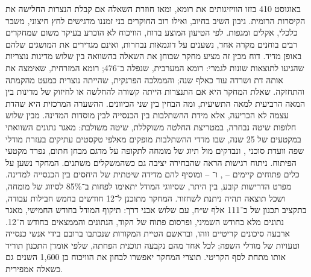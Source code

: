 
\begin{executivesummary}
באוגוסט 410 בזזו הוויזיגותים את רומא, ומאז חוזרת השאלה אם קבלת הנצרות החלישה את הקיסרות הרומית. גיבון השיב בחיוב, ואילו רוב החוקרים בני זמננו מדגישים לחץ חיצוני, משבר כלכלי, אקלים ומגפות. לפי הטיעון המוצע בדוח, הוויכוח לא הוכרע בעיקר משום שמחקרים רבים בוחנים מקרה אחד, נשענים על דוגמאות נבחרות, ואינם מגדירים את המושגים שלהם באופן מדיד. דוח מכין זה מציע מחקר שבוחן את השאלה בהשוואה בין שלוש מדינות נוצריות שהגיעו לתוצאות שונות לגמרי: רומא המערבית, שנפלה ב־476; רומא המזרחית, שאימצה את אותה דת ושרדה עוד כאלף שנה; והממלכה הפרנקית, שהייתה נוצרית כמעט מהקמתה והתחזקה. שאלת המחקר היא אם התנצרות הייתה קשורה להחלשה או לחיזוק של מדינות בין המאה הרביעית למאה התשיעית, ומה הבחין בין שני הכיוונים. ההשערה המרכזית היא שהדת עצמה לא הכריעה, אלא מידת ההשתלבות בין הכנסייה לבין מוסדות המדינה. מבין שלוש חלופות שיטה נבחרה, במטריצת החלטה משוקללת, שיטה משולבת: מאגר נתונים השוואתי במקטעים של 25 שנה, שבו מדדי ההשתלבות מופקים מאלפי טקסטים עתיקים בעזרת מודלי שפה וועדת סוכני , ונבדקים מול תיוג של מומחה לתקופה על מדגם מבחן חתום, נפרד מקטעי הפיתוח. ניתוח רגישות הראה שהבחירה יציבה גם כשהמשקלים משתנים. המחקר נשען על כלים פתוחים קיימים – ,  ו־ – ומוסיף להם מדידה שיטתית של היחסים בין הכנסייה למדינה. מפרט הדרישות קובע, בין היתר, שסיווגי המודל יתאימו לפחות ב־85\% לסיווג של מומחה, ושכל תוצאה תהיה ניתנת לשחזור. המחקר מתוכנן ל־12 חודשים בחמש חבילות עבודה, בתקציב תכנון של כ־111 אלף ש״ח, עם שלוש אבני דרך: תיקוף המודל בחודש החמישי, מאגר נתונים מלא בחודש השמיני, ופרסום פתוח של הקוד, הנתונים והממצאים בחודש ה־12. ארבעה סיכונים קריטיים זוהו, ובראשם הטיית המקורות שנכתבו ברובם בידי אנשי כנסייה וטעויות של מודלי השפה; לכל אחד מהם נקבעה תוכנית הפחתה, שלפי אומדן התכנון תוריד אותו מתחת לסף הקריטי. תוצרי המחקר יאפשרו לבחון את הוויכוח בן 1,600 השנים גם כשאלה אמפירית.
\end{executivesummary}

